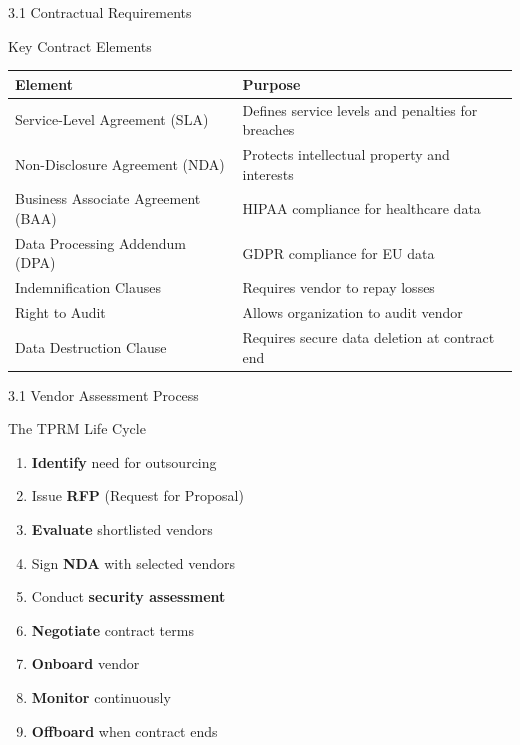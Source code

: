 \documentclass{beamer}
\begin{document}
	\begin{frame}{3.1 Contractual Requirements}
		\begin{block}{Key Contract Elements}
			\begin{tabular}{|p{2.5cm}|p{8.5cm}|}
				\hline
				\textbf{Element} & \textbf{Purpose} \\
				\hline
				Service-Level Agreement (SLA) & Defines service levels and penalties for breaches \\
				\hline
				Non-Disclosure Agreement (NDA) & Protects intellectual property and interests \\
				\hline
				Business Associate Agreement (BAA) & HIPAA compliance for healthcare data \\
				\hline
				Data Processing Addendum (DPA) & GDPR compliance for EU data \\
				\hline
				Indemnification Clauses & Requires vendor to repay losses \\
				\hline
				Right to Audit & Allows organization to audit vendor \\
				\hline
				Data Destruction Clause & Requires secure data deletion at contract end \\
				\hline
			\end{tabular}
		\end{block}
	\end{frame}
	
	\begin{frame}{3.1 Vendor Assessment Process}
		\begin{block}{The TPRM Life Cycle}
			\begin{enumerate}
				\item \textbf{Identify} need for outsourcing
				\item Issue \textbf{RFP} (Request for Proposal)
				\item \textbf{Evaluate} shortlisted vendors
				\item Sign \textbf{NDA} with selected vendors
				\item Conduct \textbf{security assessment}
				\item \textbf{Negotiate} contract terms
				\item \textbf{Onboard} vendor
				\item \textbf{Monitor} continuously
				\item \textbf{Offboard} when contract ends
			\end{enumerate}
		\end{block}
	\end{frame}
	
\end{document}
